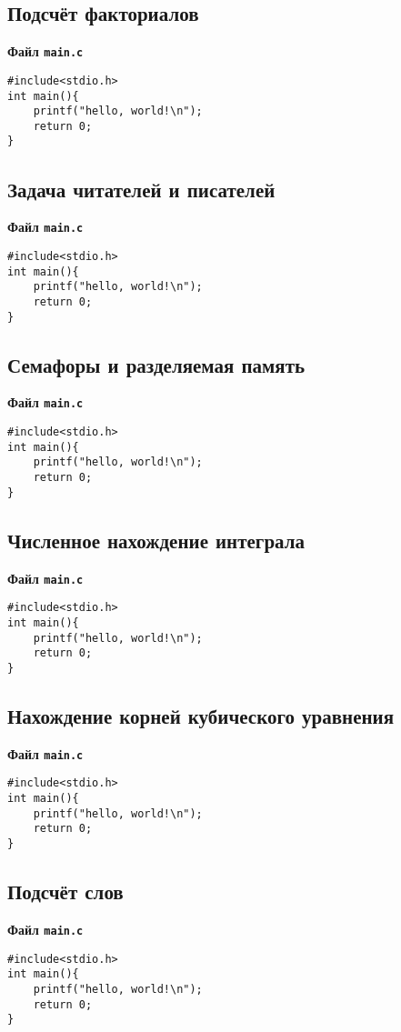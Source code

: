 \documentclass[a4paper,14pt]{extarticle}
\begin{document}
\subsection{Подсчёт факториалов}\label{code:factorial}
\centerline{\textbf{Файл \texttt{main.c}}}
\begin{verbatim}
#include<stdio.h>
int main(){	
	printf("hello, world!\n");
	return 0;
}
\end{verbatim}
\hrulefill

\subsection{Задача читателей и писателей}\label{code:read-write}
\centerline{\textbf{Файл \texttt{main.c}}}
\begin{verbatim}
#include<stdio.h>
int main(){	
	printf("hello, world!\n");
	return 0;
}
\end{verbatim}
\hrulefill

\subsection{Семафоры и разделяемая память}\label{code:sem-shm}
\centerline{\textbf{Файл \texttt{main.c}}}
\begin{verbatim}
#include<stdio.h>
int main(){	
	printf("hello, world!\n");
	return 0;
}
\end{verbatim}
\hrulefill

\subsection{Численное нахождение интеграла}\label{code:pi}
\centerline{\textbf{Файл \texttt{main.c}}}
\begin{verbatim}
#include<stdio.h>
int main(){	
	printf("hello, world!\n");
	return 0;
}
\end{verbatim}
\hrulefill

\subsection{Нахождение корней кубического уравнения}\label{code:cube-equation}
\centerline{\textbf{Файл \texttt{main.c}}}
\begin{verbatim}
#include<stdio.h>
int main(){	
	printf("hello, world!\n");
	return 0;
}
\end{verbatim}
\hrulefill

\subsection{Подсчёт слов}\label{code:wordcount}
\centerline{\textbf{Файл \texttt{main.c}}}
\begin{verbatim}
#include<stdio.h>
int main(){	
	printf("hello, world!\n");
	return 0;
}
\end{verbatim}
\hrulefill
\end{document}
